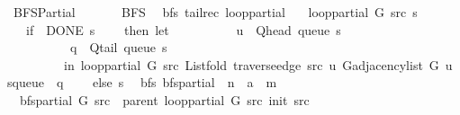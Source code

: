 %
\begin{isabellebody}%
%
%
\isadelimtheory
%
\endisadelimtheory
%
\isatagtheory
{}\isamarkupfalse%
\ BFS{\isacharunderscore}{\kern0pt}Partial\isanewline
\ \ \isanewline
\ \ \ \ BFS\isanewline
{}%
\endisatagtheory
{\isafoldtheory}%
%
\isadelimtheory
\isanewline
%
\endisadelimtheory
\isanewline
{}\isamarkupfalse%
\ {\isacharparenleft}{\kern0pt}\ bfs{\isacharparenright}{\kern0pt}\ {\isacharparenleft}{\kern0pt}tailrec{\isacharparenright}{\kern0pt}\ loop{\isacharunderscore}{\kern0pt}partial\ \isanewline
\ \ {\isachardoublequoteopen}loop{\isacharunderscore}{\kern0pt}partial\ G\ src\ s\ {\isacharequal}{\kern0pt}\isanewline
\ \ \ {\isacharparenleft}{\kern0pt}if\ {\isasymnot}\ DONE\ s\isanewline
\ \ \ \ then\ let\isanewline
\ \ \ \ \ \ \ \ \ \ u\ {\isacharequal}{\kern0pt}\ Q{\isacharunderscore}{\kern0pt}head\ {\isacharparenleft}{\kern0pt}queue\ s{\isacharparenright}{\kern0pt}{\isacharsemicolon}{\kern0pt}\isanewline
\ \ \ \ \ \ \ \ \ \ q\ {\isacharequal}{\kern0pt}\ Q{\isacharunderscore}{\kern0pt}tail\ {\isacharparenleft}{\kern0pt}queue\ s{\isacharparenright}{\kern0pt}\isanewline
\ \ \ \ \ \ \ \ \ in\ loop{\isacharunderscore}{\kern0pt}partial\ G\ src\ {\isacharparenleft}{\kern0pt}List{\isachardot}{\kern0pt}fold\ {\isacharparenleft}{\kern0pt}traverse{\isacharunderscore}{\kern0pt}edge\ src\ u{\isacharparenright}{\kern0pt}\ {\isacharparenleft}{\kern0pt}G{\isachardot}{\kern0pt}adjacency{\isacharunderscore}{\kern0pt}list\ G\ u{\isacharparenright}{\kern0pt}\ {\isacharparenleft}{\kern0pt}s{\isasymlparr}queue\ {\isacharcolon}{\kern0pt}{\isacharequal}{\kern0pt}\ q{\isasymrparr}{\isacharparenright}{\kern0pt}{\isacharparenright}{\kern0pt}\isanewline
\ \ \ \ else\ s{\isacharparenright}{\kern0pt}{\isachardoublequoteclose}\isanewline
\isanewline
{}\isamarkupfalse%
\ {\isacharparenleft}{\kern0pt}\ bfs{\isacharparenright}{\kern0pt}\ bfs{\isacharunderscore}{\kern0pt}partial\ {\isacharcolon}{\kern0pt}{\isacharcolon}{\kern0pt}\ {\isachardoublequoteopen}{\isacharprime}{\kern0pt}n\ {\isasymRightarrow}\ {\isacharprime}{\kern0pt}a\ {\isasymRightarrow}\ {\isacharprime}{\kern0pt}m{\isachardoublequoteclose}\ \isanewline
\ \ {\isachardoublequoteopen}bfs{\isacharunderscore}{\kern0pt}partial\ G\ src\ {\isasymequiv}\ parent\ {\isacharparenleft}{\kern0pt}loop{\isacharunderscore}{\kern0pt}partial\ G\ src\ {\isacharparenleft}{\kern0pt}init\ src{\isacharparenright}{\kern0pt}{\isacharparenright}{\kern0pt}{\isachardoublequoteclose}\isanewline

\end{isabellebody}
